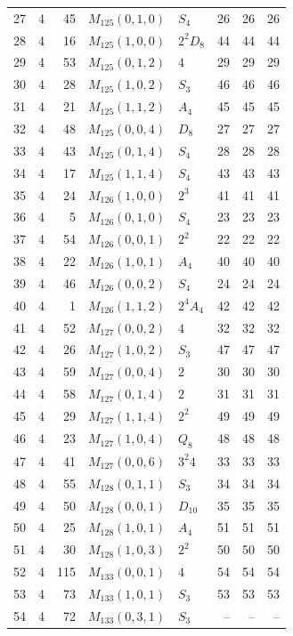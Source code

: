 \documentclass[11pt,a4paper]{article}
\begin{document}
\begin{longtable}{rrr|l|l|rrr}
27 & 4 & 45 & $M_{125}(0,1,0)$ & $S_4$ & 26 & 26 & 26\\
28 & 4 & 16 & $M_{125}(1,0,0)$ & $2^2 D_8$ & 44 & 44 & 44\\
29 & 4 & 53 & $M_{125}(0,1,2)$ & $4$ & 29 & 29 & 29\\
30 & 4 & 28 & $M_{125}(1,0,2)$ & $S_3$ & 46 & 46 & 46\\
31 & 4 & 21 & $M_{125}(1,1,2)$ & $A_4$ & 45 & 45 & 45\\
32 & 4 & 48 & $M_{125}(0,0,4)$ & $D_8$ & 27 & 27 & 27\\
33 & 4 & 43 & $M_{125}(0,1,4)$ & $S_4$ & 28 & 28 & 28\\
34 & 4 & 17 & $M_{125}(1,1,4)$ & $S_4$ & 43 & 43 & 43\\
35 & 4 & 24 & $M_{126}(1,0,0)$ & $2^3$ & 41 & 41 & 41\\
36 & 4 & 5 & $M_{126}(0,1,0)$ & $S_4$ & 23 & 23 & 23\\
37 & 4 & 54 & $M_{126}(0,0,1)$ & $2^2$ & 22 & 22 & 22\\
38 & 4 & 22 & $M_{126}(1,0,1)$ & $A_4$ & 40 & 40 & 40\\
39 & 4 & 46 & $M_{126}(0,0,2)$ & $S_4$ & 24 & 24 & 24\\
40 & 4 & 1 & $M_{126}(1,1,2)$ & $2^4 A_4$ & 42 & 42 & 42\\
41 & 4 & 52 & $M_{127}(0,0,2)$ & $4$ & 32 & 32 & 32\\
42 & 4 & 26 & $M_{127}(1,0,2)$ & $S_3$ & 47 & 47 & 47\\
43 & 4 & 59 & $M_{127}(0,0,4)$ & $2$ & 30 & 30 & 30\\
44 & 4 & 58 & $M_{127}(0,1,4)$ & $2$ & 31 & 31 & 31\\
45 & 4 & 29 & $M_{127}(1,1,4)$ & $2^2$ & 49 & 49 & 49\\
46 & 4 & 23 & $M_{127}(1,0,4)$ & $Q_8$ & 48 & 48 & 48\\
47 & 4 & 41 & $M_{127}(0,0,6)$ & $3^2 4$ & 33 & 33 & 33\\
48 & 4 & 55 & $M_{128}(0,1,1)$ & $S_3$ & 34 & 34 & 34\\
49 & 4 & 50 & $M_{128}(0,0,1)$ & $D_{10}$ & 35 & 35 & 35\\
50 & 4 & 25 & $M_{128}(1,0,1)$ & $A_4$ & 51 & 51 & 51\\
51 & 4 & 30 & $M_{128}(1,0,3)$ & $2^2$ & 50 & 50 & 50\\
52 & 4 & 115 & $M_{133}(0,0,1)$ & $4$ & 54 & 54 & 54\\
53 & 4 & 73 & $M_{133}(1,0,1)$ & $S_3$ & 53 & 53 & 53\\
54 & 4 & 72 & $M_{133}(0,3,1)$ & $S_3$ & -- & -- & --\\

\end{longtable}
\end{document}
